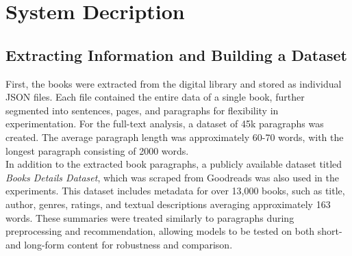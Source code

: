 \documentclass[conference]{IEEEtran}
\begin{document}
\section{System Decription}
\subsection*{Extracting Information and Building a Dataset}
First, the books were extracted from the digital library and stored as individual JSON files. Each file contained the entire data of a single book, further segmented into sentences, pages, and paragraphs for flexibility in experimentation.
For the full-text analysis, a dataset of 45k paragraphs was created. The average paragraph length was approximately 60-70 words, with the longest paragraph consisting of 2000 words.\\
In addition to the extracted book paragraphs, a publicly available dataset titled \textit{Books Details Dataset}, which was scraped from Goodreads %
was also used in the experiments. This dataset includes metadata for over 13,000 books, such as title, author, genres, ratings, and textual descriptions averaging approximately 163 words. These summaries were treated similarly to paragraphs during preprocessing and recommendation, allowing models to be tested on both short- and long-form content for robustness and comparison.
\end{document}
